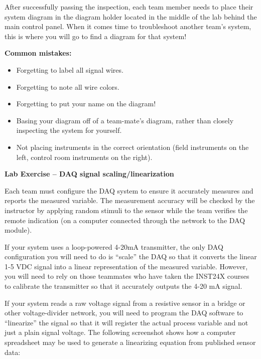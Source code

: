 \documentclass[12pt,a4paper]{article}
\begin{document}
\begin{itemize}
After successfully passing the inspection, each team member needs to place their system diagram in the diagram holder located in the middle of the lab behind the main control panel.  When it comes time to troubleshoot another team's system, this is where you will go to find a diagram for that system!

\vskip 10pt

{\bf Common mistakes:}

\begin{itemize}
\item{} Forgetting to label all signal wires.
\item{} Forgetting to note all wire colors.
\item{} Forgetting to put your name on the diagram!
\item{} Basing your diagram off of a team-mate's diagram, rather than closely inspecting the system for yourself.
\item{} Not placing instruments in the correct orientation (field instruments on the left, control room instruments on the right).
\end{itemize}





\vfil \eject

\noindent
{\bf Lab Exercise -- DAQ signal scaling/linearization}

\vskip 5pt

Each team must configure the DAQ system to ensure it accurately measures and reports the measured variable.  The measurement accuracy will be checked by the instructor by applying random stimuli to the sensor while the team verifies the remote indication (on a computer connected through the network to the DAQ module).

If your system uses a loop-powered 4-20mA transmitter, the only DAQ configuration you will need to do is ``scale'' the DAQ so that it converts the linear 1-5 VDC signal into a linear representation of the measured variable.  However, you will need to rely on those teammates who have taken the INST24X courses to calibrate the transmitter so that it accurately outputs the 4-20 mA signal.

If your system reads a raw voltage signal from a resistive sensor in a bridge or other voltage-divider network, you will need to program the DAQ software to ``linearize'' the signal so that it will register the actual process variable and not just a plain signal voltage.  The following screenshot shows how a computer spreadsheet may be used to generate a linearizing equation from published sensor data:


\end{itemize}
\end{document}
